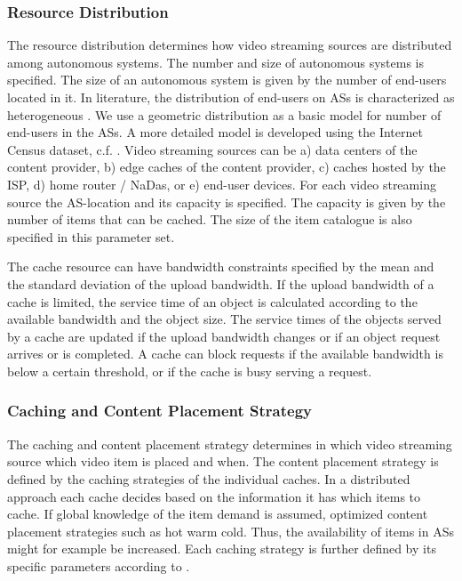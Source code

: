\subsubsection{Resource Distribution}
The resource distribution determines how video streaming sources are distributed among autonomous systems.
The number and size of autonomous systems is specified.
The size of an autonomous system is given by the number of end-users located in it.
In literature, the distribution of end-users on ASs is characterized as heterogeneous \cite{Hossfeld2011}.
We use a geometric distribution as a basic model for number of end-users in the ASs.
A more detailed model is developed using the Internet Census dataset, c.f. .
Video streaming sources can be a) data centers of the content provider, b) edge caches of the content provider, c) caches hosted by the ISP, d) home router / NaDas, or e) end-user devices.
For each video streaming source the AS-location and its capacity is specified.
The capacity is given by the number of items that can be cached.
The size of the item catalogue is also specified in this parameter set.

The cache resource can have bandwidth constraints specified by the mean and the standard deviation of the upload bandwidth.
If the upload bandwidth of a cache is limited, the service time of an object is calculated according to the available bandwidth and the object size.
The service times of the objects served by a cache are updated if the upload bandwidth changes or if an object request arrives or is completed.
A cache can block requests if the available bandwidth is below a certain threshold, or if the cache is busy serving a request.

\subsubsection{Caching and Content Placement Strategy}
The caching and content placement strategy determines in which video streaming source which video item is placed and when.
The content placement strategy is defined by the caching strategies of the individual caches.
In a distributed approach each cache decides based on the information it has which items to cache.
If global knowledge of the item demand is assumed, optimized content placement strategies such as hot warm cold.
Thus, the availability of items in ASs might for example be increased.
Each caching strategy is further defined by its specific parameters according to .

